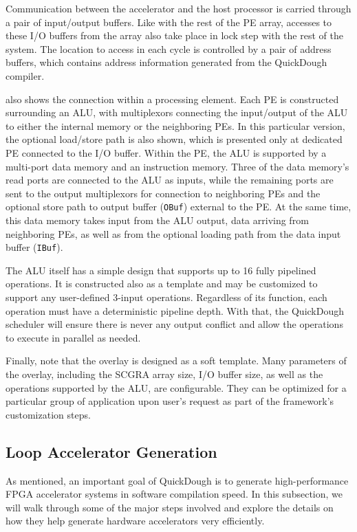 Communication between the accelerator and the host processor is carried through a pair of input/output buffers.
Like with the rest of the PE array, accesses to these I/O buffers from the array also take place in lock step with the rest of the system.
The location to access in each cycle is controlled by a pair of address buffers, which contains address information generated from the QuickDough compiler. 

 also shows the connection within a processing element.
Each PE is constructed surrounding an ALU, with multiplexors connecting the input/output of the ALU to either the internal memory or the neighboring PEs.
In this particular version, the optional load/store path is also shown, which is presented only at dedicated PE connected to the I/O buffer.
Within the PE, the ALU is supported by a multi-port data memory and an instruction memory.
Three of the data memory's read ports are connected to the ALU as inputs, while the remaining ports are sent to the output multiplexors for connection to neighboring PEs and the optional store path to output buffer (\texttt{OBuf}) external to the PE.
At the same time, this data memory takes input from the ALU output, data arriving from neighboring PEs, as well as from the optional loading path from the data input buffer (\texttt{IBuf}).

The ALU itself has a simple design that supports up to 16 fully pipelined operations.
It is constructed also as a template and may be customized to support any user-defined 3-input operations.
Regardless of its function, each operation must have a deterministic pipeline depth.
With that, the QuickDough scheduler will ensure there is never any output conflict and allow the operations to execute in parallel as needed.

Finally, note that the overlay is designed as a soft template.
Many parameters of the overlay, including the SCGRA array size, I/O buffer size, as well as the operations supported by the ALU, are configurable.
They can be optimized for a particular group of application upon user's request as part of the framework's customization steps.






\subsection{Loop Accelerator Generation}
As mentioned, an important goal of QuickDough is to generate high-performance FPGA accelerator systems in software compilation speed.  In this subsection, we will walk through some of the major steps involved and explore the details on how they help generate hardware accelerators very efficiently.


